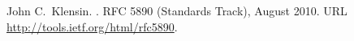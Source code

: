 \documentclass[12pt]{article}  %
\begin{document}
\begin{thebibliography}{2}
John C.\ Klensin.
.
\newblock RFC 5890 (Standards Track), August 2010.
\newblock URL \url{http://tools.ietf.org/html/rfc5890}.



\end{thebibliography}
\end{document}
